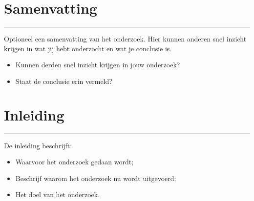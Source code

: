 \documentclass[a4paper, 11pt, oneside]{report}
\begin{document}

\tableofcontents
\clearpage






\chapter*{Samenvatting}

\hrule
Optioneel een samenvatting van het onderzoek. Hier kunnen anderen snel inzicht krijgen in wat jij hebt onderzocht en wat je conclusie is.
\begin{itemize}
	\item Kunnen derden snel inzicht krijgen in jouw onderzoek?
	\item Staat de conclusie erin vermeld?
\end{itemize}

\chapter{Inleiding}
\label{chapter:inleiding}

\hrule
De inleiding beschrijft:
\begin{itemize}
\item Waarvoor het onderzoek gedaan wordt;
\item Beschrijf waarom het onderzoek nu wordt uitgevoerd;
\item Het doel van het onderzoek.
\end{itemize}
\end{document}
